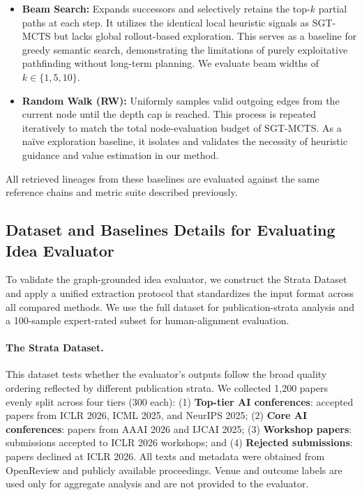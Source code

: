 \documentclass{opendatalab}
\begin{document}
\begin{itemize}
\item \textbf{Beam Search:} Expands successors and selectively retains the top-$k$ partial paths at each step. It utilizes the identical local heuristic signals as SGT-MCTS but lacks global rollout-based exploration. This serves as a baseline for greedy semantic search, demonstrating the limitations of purely exploitative pathfinding without long-term planning. We evaluate beam widths of $k \in \{1, 5, 10\}$.
\item \textbf{Random Walk (RW):} Uniformly samples valid outgoing edges from the current node until the depth cap is reached. This process is repeated iteratively to match the total node-evaluation budget of SGT-MCTS. As a naïve exploration baseline, it isolates and validates the necessity of heuristic guidance and value estimation in our method.
\end{itemize}

All retrieved lineages from these baselines are evaluated against the same reference chains and metric suite described previously.

\subsection{Dataset and Baselines Details for Evaluating Idea Evaluator}
\label{app:idea-eval-data}
To validate the graph-grounded idea evaluator, we construct the Strata Dataset and apply a unified extraction protocol that standardizes the input format across all compared methods. We use the full dataset for publication-strata analysis and a 100-sample expert-rated subset for human-alignment evaluation.

\paragraph{The Strata Dataset.}
This dataset tests whether the evaluator's outputs follow the broad quality ordering reflected by different publication strata. We collected 1,200 papers evenly split across four tiers (300 each): (1) \textbf{Top-tier AI conferences}: accepted papers from ICLR 2026, ICML 2025, and NeurIPS 2025; (2) \textbf{Core AI conferences}: papers from AAAI 2026 and IJCAI 2025; (3) \textbf{Workshop papers}: submissions accepted to ICLR 2026 workshops; and (4) \textbf{Rejected submissions}: papers declined at ICLR 2026. All texts and metadata were obtained from OpenReview and publicly available proceedings. Venue and outcome labels are used only for aggregate analysis and are not provided to the evaluator.
\end{document}
